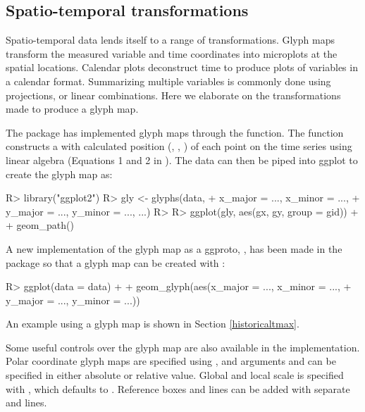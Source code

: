 \documentclass[
  shortnames]{jss}
\begin{document}
\hypertarget{st_transformation}{%
\subsection{Spatio-temporal transformations}\label{st_transformation}}

Spatio-temporal data lends itself to a range of transformations. Glyph maps \citep{Wickham2012-yr} transform the measured variable and time coordinates into microplots at the spatial locations. Calendar plots \citep{wang2020calendar} deconstruct time to produce plots of variables in a calendar format. Summarizing multiple variables is commonly done using projections, or linear combinations. Here we elaborate on the transformations made to produce a glyph map.

The package  \citep{ggally} has implemented glyph maps through the  function. The function constructs a  with calculated position (, , ) of each point on the time series using linear algebra (Equations 1 and 2 in \citet{Wickham2012-yr}). The data can then be piped into ggplot to create the glyph map as:

\begin{CodeChunk}
\begin{CodeInput}
R> library("ggplot2")
R> gly <- glyphs(data,
+               x_major = ..., x_minor = ...,
+               y_major = ..., y_minor = ..., ...)
R> 
R> ggplot(gly, aes(gx, gy, group = gid)) +
+   geom_path()
\end{CodeInput}
\end{CodeChunk}

A new implementation of the glyph map as a ggproto, , has been made in the  package so that a glyph map can be created with :

\begin{CodeChunk}
\begin{CodeInput}
R> ggplot(data = data) +
+   geom_glyph(aes(x_major = ..., x_minor = ...,
+                  y_major = ..., y_minor = ...))
\end{CodeInput}
\end{CodeChunk}

An example using a glyph map is shown in Section \ref{historicaltmax}.

Some useful controls over the glyph map are also available in the  implementation. Polar coordinate glyph maps are specified using , and arguments  and  can be specified in either absolute or relative value. Global and local scale is specified with , which defaults to . Reference boxes and lines can be added with separate  and  lines.
\end{document}
